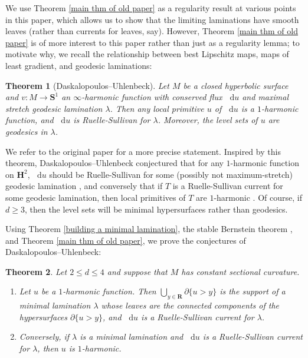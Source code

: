 \documentclass[reqno,11pt]{amsart}
\newcommand{\RR}{\mathbf{R}}
\newcommand{\Hyp}{\mathbf H}
\newcommand{\Sph}{\mathbf S}
\newcommand*\dif{\mathop{}\!\mathrm{d}}
\newtheorem{theorem}{Theorem}[section]
\theoremstyle{definition}
\numberwithin{equation}{section}
\begin{document}
We use Theorem \ref{main thm of old paper} as a regularity result at various points in this paper, which allows us to show that the limiting laminations have smooth leaves (rather than currents for leaves, say).
However, Theorem \ref{main thm of old paper} is of more interest to this paper rather than just as a regularity lemma; to motivate why, we recall the relationship between best Lipschitz maps, maps of least gradient, and geodesic laminations:

\begin{theorem}[Daskalopoulos--Uhlenbeck]\label{DU theorem}
Let $M$ be a closed hyperbolic surface and $v: M \to \Sph^1$ an $\infty$-harmonic function with conserved flux $\dif u$ and maximal stretch geodesic lamination $\lambda$.
Then any local primitive $u$ of $\dif u$ is a $1$-harmonic function, and $\dif u$ is Ruelle-Sullivan for $\lambda$.
Moreover, the level sets of $u$ are geodesics in $\lambda$.
\end{theorem}

We refer to the original paper \cite{daskalopoulos2020transverse} for a more precise statement.
Inspired by this theorem, Daskalopoulos--Uhlenbeck conjectured that for any $1$-harmonic function on $\Hyp^2$, $\dif u$ should be Ruelle-Sullivan for some (possibly not maximum-stretch) geodesic lamination \cite[Problem 9.4]{daskalopoulos2020transverse}, and conversely that if $T$ is a Ruelle-Sullivan current for some geodesic lamination, then local primitives of $T$ are $1$-harmonic \cite[Conjecture 9.5]{daskalopoulos2020transverse}.
Of course, if $d \geq 3$, then the level sets will be minimal hypersurfaces rather than geodesics.

Using Theorem \ref{building a minimal lamination}, the stable Bernstein theorem \cite{Schoen2016, Chodosh2021}, and Theorem \ref{main thm of old paper}, we prove the conjectures of Daskalopoulos--Uhlenbeck:

\begin{theorem}\label{main thm}
Let $2 \leq d \leq 4$ and suppose that $M$ has constant sectional curvature.
\begin{enumerate}
\item Let $u$ be a $1$-harmonic function.
Then $\bigcup_{y \in \RR} \partial \{u > y\}$ is the support of a minimal lamination $\lambda$ whose leaves are the connected components of the hypersurfaces $\partial \{u > y\}$, and $\dif u$ is a Ruelle-Sullivan current for $\lambda$.
\item Conversely, if $\lambda$ is a minimal lamination and $\dif u$ is a Ruelle-Sullivan current for $\lambda$, then $u$ is $1$-harmonic.
\end{enumerate}
\end{theorem}
\end{document}
